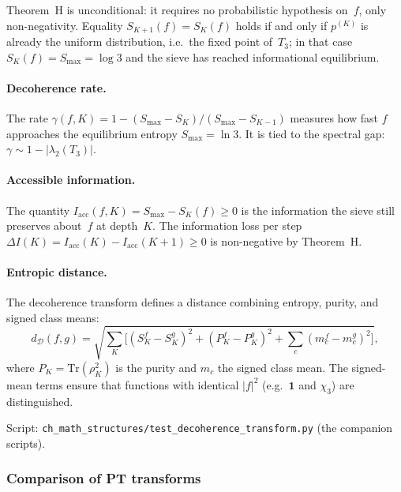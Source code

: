 \documentclass[12pt,a4paper]{article}
\begin{document}
\begin{remark}
Theorem~H is unconditional: it requires no probabilistic
hypothesis on~$f$, only non-negativity.  Equality $S_{K+1}(f) =
S_K(f)$ holds if and only if $p^{(K)}$ is already the uniform
distribution, i.e.\ the fixed point of~$T_3$; in that case
$S_K(f) = S_{\max} = \log 3$ and the sieve has reached
informational equilibrium.
\end{remark}

\paragraph{Decoherence rate.}
The rate $\gamma(f,K) = 1 - (S_{\max} - S_K)/(S_{\max} - S_{K-1})$
measures how fast $f$ approaches the equilibrium entropy
$S_{\max} = \ln 3$.  It is tied to the spectral gap:
$\gamma \sim 1 - |\lambda_2(T_3)|$.

\paragraph{Accessible information.}
The quantity $I_{\mathrm{acc}}(f,K) = S_{\max} - S_K(f) \geq 0$
is the information the sieve still preserves about~$f$ at
depth~$K$.  The information loss per step
$\Delta I(K) = I_{\mathrm{acc}}(K) - I_{\mathrm{acc}}(K+1) \geq 0$
is non-negative by Theorem~H.

\paragraph{Entropic distance.}
The decoherence transform defines a distance combining entropy,
purity, and signed class means:
\begin{equation}
  d_{\mathcal{D}}(f,g)
  = \sqrt{\sum_K \bigl[
    (S_K^f - S_K^g)^2 + (P_K^f - P_K^g)^2
    + \textstyle\sum_c (m_c^f - m_c^g)^2
  \bigr]},
  \label{eq:decoherence_distance}
\end{equation}
where $P_K = \mathrm{Tr}(\rho_K^2)$ is the purity and $m_c$ the
signed class mean.  The signed-mean terms ensure that functions
with identical $|f|^2$ (e.g.\ $\mathbf{1}$ and $\chi_3$) are
distinguished.

Script: \texttt{ch\_math\_structures/test\_decoherence\_transform.py}
(the companion scripts).


\subsubsection{Comparison of PT transforms}
\end{document}
